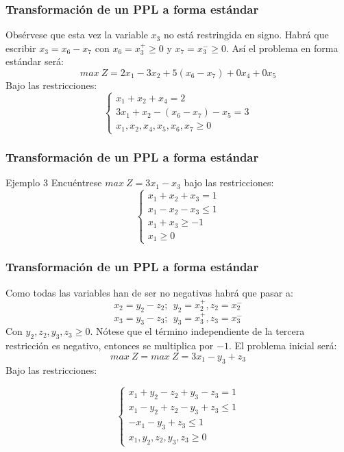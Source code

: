 \documentclass{beamer}
\begin{document}
\begin{frame}
\frametitle{Transformaci\'on de un PPL a forma est\'andar}
Obs\'ervese que esta vez la variable $x_3$ no est\'a restringida en signo. Habr\'a que escribir $x_3 = x_6-x_7$ con $x_6 = x_3^{+}\geq 0$ y $x_7 = x_3^{-}\geq 0$. As\'i el problema en forma est\'andar ser\'a:
\[max\ Z = 2x_1-3x_2+5(x_6-x_7)+0x_4+0x_5\]
Bajo las restricciones:
\[\left\{\begin{array}{l}x_1+x_2 +x_4  = 2 \\3x_1+x_2-(x_6-x_7)-x_5 = 3 \\x_1,x_2, x_4, x_5, x_6, x_7\geq 0 \end{array}\right.\]

\end{frame}




\begin{frame}
\frametitle{Transformaci\'on de un PPL a forma est\'andar}
\begin{block}{Ejemplo 3}
Encu\'entrese $max\ Z = 3x_1-x_3$ bajo las restricciones:
\[\left\{\begin{array}{l}x_1+x_2+x_3 = 1 \\x_1-x_2-x_3\leq 1\\ x_1+x_3\geq -1 \\x_1\geq 0 \end{array}\right.\]

\end{block}
\end{frame}



\begin{frame}
\frametitle{Transformaci\'on de un PPL a forma est\'andar}
Como todas las variables han de ser no negativas habr\'a que pasar a:
\[x_2 = y_2-z_2; \ \ y_2 = x_2^{+},z_2 = x_2^{-}\]
\[x_3 = y_3-z_3; \ \ y_3 = x_3^{+},z_3 = x_3^{-}\]
Con $y_2,z_2,y_3,z_3\geq 0$. N\'otese que el t\'ermino independiente de la tercera restricci\'on es negativo, entonces se multiplica por $-1$. El problema inicial ser\'a:
\[max\ Z = max\ Z = 3x_1-y_3+z_3\]
Bajo las restricciones:

\[\left\{\begin{array}{l}x_1+y_2-z_2+y_3-z_3  = 1 \\x_1-y_2+z_2-y_3+z_3\leq 1 \\ -x_1-y_3+z_3\leq 1\\x_1,y_2,z_2, y_3, z_3\geq 0 \end{array}\right.\]

\end{frame}
\end{document}
